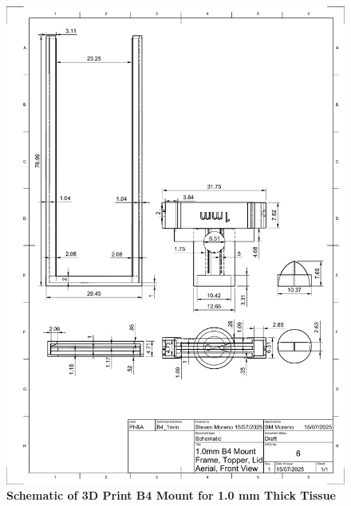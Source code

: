     \begin{figure}[H]
        \centering
        \includegraphics[width=1\linewidth]{Figures/1.0mm B5 Drawing v1.pdf}
        \caption{\textbf{Schematic of 3D Print B4 Mount for 1.0 mm Thick Tissue}}
        \label{fig:enter-label}
    \end{figure}
    

